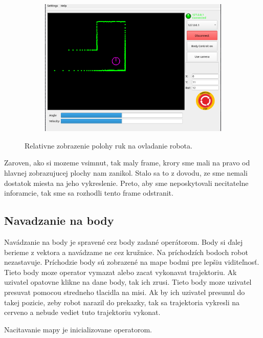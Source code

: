 \begin{figure}[!htbp]
	\vspace{\baselineskip}

	\begin{subfigure}{0.49\textwidth}
		\includegraphics[width=\textwidth]{img/body-control.png}
	\end{subfigure}

	\caption{ Relativne zobrazenie polohy ruk na ovladanie robota. }
	\label{fig:progres-bars}
\end{figure}

Zaroven, ako si mozeme vsimnut, tak maly frame, krory sme mali na pravo od hlavnej zobrazujucej plochy nam zanikol.
Stalo sa to z dovodu, ze sme nemali dostatok miesta na jeho vykreslenie. Preto, aby sme neposkytovali necitatelne
inforamcie, tak sme sa rozhodli tento frame odstranit.

\newpage

\subsection{Navadzanie na body}

Navádzanie na body je spravené cez body zadané operátorom. Body si ďalej berieme
z vektora a navádzame ne cez kružnice. Na príchodzích bodoch robot nezastavuje.
Príchodzie body sú zobrazené na mape bodmi pre lepšiu viditeľnosť. Tieto body moze operator vymazat alebo zacat
vykonavat trajektoriu. Ak uzivatel opatovne klikne na dane body, tak ich zrusi. Tieto body moze uzivatel presuvat
pomocou stredneho tlacidla na misi. Ak by ich uzivatel presunul do takej pozicie, zeby robot narazil do prekazky, tak sa
trajektoria vykresli na cerveno a nebude vediet tuto trajektoriu vykonat.

Nacitavanie mapy je inicializovane operatorom.

